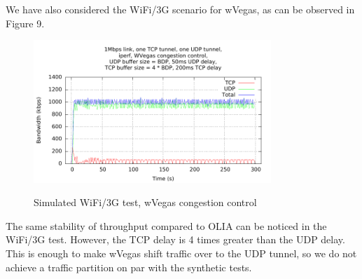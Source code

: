 We have also considered the WiFi/3G scenario for wVegas, as can be observed in
Figure 9.

\begin{figure}[H]
  \centering
  \includegraphics[width=0.8\textwidth]{img/wvegas-mptcp-unequal}
  \label{fig:mobile-wvegas}
  \caption{Simulated WiFi/3G test, wVegas congestion control}
\end{figure}

The same stability of throughput compared to OLIA can be noticed in the
WiFi/3G test. However, the TCP delay is 4 times greater than the UDP delay.
This is enough to make wVegas shift traffic over to the UDP tunnel, so we do
not achieve a traffic partition on par with the synthetic tests.
